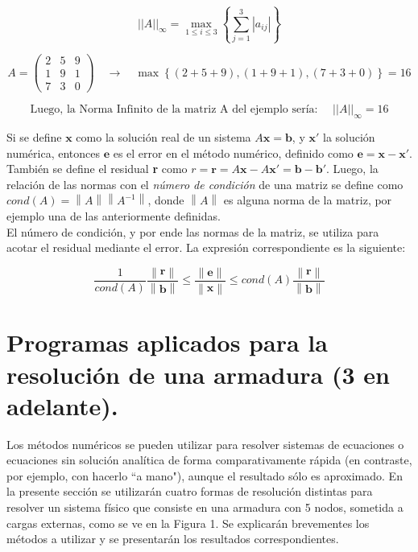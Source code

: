 \documentclass[12pt, notitlepage]{article}
\newcommand{\norm}[1]{\left\lVert#1\right\rVert}
\begin{document}
\begin{equation*}
||A||_\infty = \max\limits_{1\leq i \leq 3} \left\lbrace \sum_{j=1}^3 |a_{ij}| \right\rbrace
\end{equation*}

\begin{equation*}
A = \begin{pmatrix}
2 & 5 & 9 \\
1 & 9 & 1 \\
7 & 3 & 0
\end{pmatrix} \quad \rightarrow \quad \max\left\lbrace (2+5+9),(1+9+1),(7+3+0)\right\rbrace = 16
\end{equation*}

\begin{equation*}
\text{Luego, la Norma Infinito de la matriz A del ejemplo sería: } \quad ||A||_\infty = 16
\end{equation*}

Si se define $\textbf{x}$ como la solución real de un sistema $A\textbf{x} = \textbf{b}$, y $\textbf{x}'$ la solución numérica, entonces $\textbf{e}$ es el error en el método numérico, definido como $\mathbf{e} = \mathbf{x} - \mathbf{x}'$.\\
También se define el residual \textbf{r} como $r = \mathbf{r} = A\mathbf{x} - A\mathbf{x}' = \mathbf{b} - \mathbf{b}'$. Luego, la relación de las normas con el \textit{número de condición} de una matriz se define como $cond(A) = \norm{A}\norm{A^{-1}}$, donde $\norm{A}$ es alguna norma de la matriz, por ejemplo una de las anteriormente definidas.\\

El número de condición, y por ende las normas de la matriz, se utiliza para acotar el residual mediante el error. La expresión correspondiente es la siguiente:

\begin{equation*}
\frac{1}{cond(A)} \frac{\norm{\mathbf{r}}}{\norm{\mathbf{b}}} \leq \frac{\norm{\mathbf{e}}}{\norm{\mathbf{x}}} \leq cond(A)\frac{\norm{\mathbf{r}}}{\norm{\mathbf{b}}}
\end{equation*}

\newpage

\section{Programas aplicados para la resolución de una armadura (3 en adelante).}
Los métodos numéricos se pueden utilizar para resolver sistemas de ecuaciones o ecuaciones sin solución analítica de forma comparativamente rápida (en contraste, por ejemplo, con hacerlo ``a mano"), aunque el resultado sólo es aproximado. En la presente sección se utilizarán cuatro formas de resolución distintas para resolver un sistema físico que consiste en una armadura con 5 nodos, sometida a cargas externas, como se ve en la Figura 1. Se explicarán brevementes los métodos a utilizar y se presentarán los resultados correspondientes.
\end{document}

